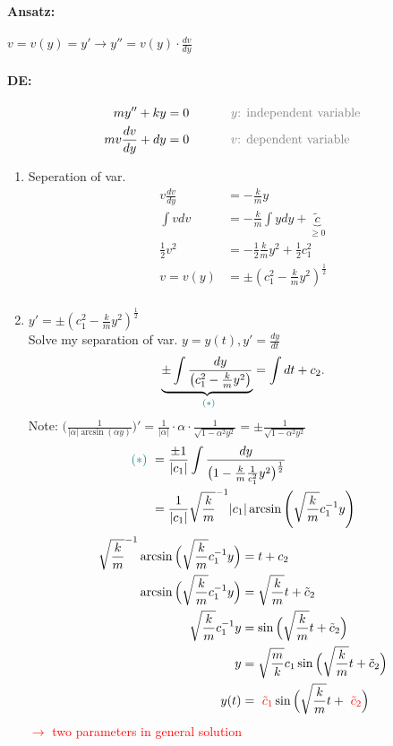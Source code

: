 \documentclass[]{article}
\begin{document}
\paragraph{Ansatz:} $v=v(y)=y'\longrightarrow y''=v(y) \cdot \frac{dv}{dy}$
\paragraph{DE:} \[
\begin{split}
	my''+ky &=0\quad\quad\quad \text{ \textcolor{gray}{$y$: independent variable}}\\
	mv \frac{dv}{dy}+dy &=0 \quad\quad\quad \text{ \textcolor{gray}{$v$: dependent variable}}\\
\end{split}\]
\begin{enumerate}
	\item Seperation of var.
		\[
		\begin{split}
			v \frac{dv}{dy} &=- \frac{k}{m}y\\
			\int v dv &=- \frac{k}{m} \int ydy +\underbrace{\tilde c}_{\ge 0}\\
			\frac{1}{2}v ^{2} &= - \frac{1}{2} \frac{k}{m}y ^{2} +  \frac{1}{2}c_1 ^{2}\\
		v= v(y) &= \pm (c_1 ^{2} - \frac{k}{m}y ^{2}) ^{ \frac{1}{2}}\\
		\end{split}
		\]
	\item $y'=\pm (c_1 ^{2} - \frac{k}{m}y ^{2}) ^{ \frac{1}{2}}$\\
		Solve my separation of var. $y=y(t),y'= \frac{dy}{dt}$
		\[
			\underbrace{\pm \int \frac{dy}{\big(c_1 ^{2} - \frac{k}{m}y ^{2}\big)}}_{ \text{ \textcolor{teal}{$(*)$}}}= \int dt +c_2
		.\]
		Note: $\big( \frac{1}{|\alpha|\arcsin (\alpha y)}\big)'= \frac{1}{|\alpha|} \cdot \alpha \cdot \frac{1}{\sqrt{1-\alpha ^{2}y ^{2}}}=\pm \frac{1}{\sqrt{1-\alpha ^{2} y ^{2}}}$
		\[
		\begin{split}
			\text{\textcolor{teal}{$(*)~$}} &= \frac{\pm1}{|c_1|} \int \frac{dy}{\big(1- \frac{k}{m} \frac{1}{c_1 ^{2}}y ^{2}\big) ^{ \frac{1}{2}}}\\
							&= \frac{1}{|c_1|} \sqrt{ \frac{k}{m}} ^{-1}|c_1| \arcsin\Bigg(\sqrt \frac{k}{m}c_1 ^{-1} y\Bigg) \\
		\end{split}
		\]
		\[
		\begin{split}
			\sqrt \frac{k}{m} ^{-1} \arcsin\Big( \sqrt \frac{k}{m}c_1 ^{-1}y\Big) &= t+c_2\\
			\arcsin\Big(\sqrt \frac{k}{m}c_1 ^{-1}y\Big) &= \sqrt \frac{k}{m}t+\tilde c_2\\
			\sqrt \frac{k}{m}c_1 ^{-1} y &= \sin\Big(\sqrt \frac{k}{m}t+\tilde c_2\Big)\\
			y &=\sqrt \frac{m}{k}c_1 \sin\Big(\sqrt \frac{k}{m}t+\tilde c_2\Big)\\
			y(t) &= \text{ \textcolor{red}{$\tilde c_1$}} \sin\Big(\sqrt \frac{k}{m}t+ \text{ \textcolor{red}{$\tilde c_2$}}\Big)\\
		\end{split}
		\]
		\textcolor{red}{$\to$ two parameters in general solution}
\end{enumerate}
\end{document}

